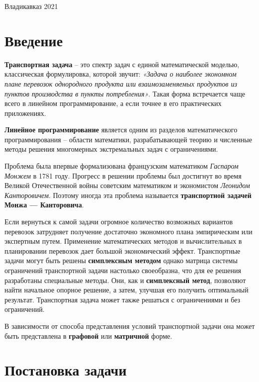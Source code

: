 \documentclass[a4paper,12pt]{article}
\begin{document}
\normalsize{ \hspace{28pt}} \hfill \break
\begin{center} Владикавказ 2021 \end{center}
\thispagestyle{empty}


\tableofcontents{}
\clearpage

\section{Введение}
	\textbf{Транспортная задача} – это спектр задач с единой математической моделью, классическая формулировка, которой звучит: \textit{«Задача о наиболее экономном плане перевозок однородного продукта или взаимозаменяемых продуктов из пунктов производства в пункты потребления»}. Такая форма встречается чаще всего в линейном программирование, а если точнее в его практических приложениях. 
	
	\textbf{Линейное программирование} является одним из разделов математического программирования – области математики, разрабатывающей теорию и численные методы решения многомерных экстремальных задач с ограничениями.
	
	Проблема была впервые формализована французским математиком \textit{Гаспаром Монжем} в 1781 году. Прогресс в решении проблемы был достигнут во время Великой Отечественной войны советским математиком и экономистом \textit{Леонидом Канторовичем}. Поэтому иногда эта проблема называется \textbf{транспортной задачей Монжа — Канторовича}.
	
	Если вернуться к самой задачи огромное количество возможных вариантов перевозок затрудняет получение достаточно экономного плана эмпирическим или экспертным путем. Применение математических методов и вычислительных в планировании перевозок дает большой экономический эффект. Транспортные задачи могут быть решены \textbf{симплексным методом} однако матрица системы ограничений транспортной задачи настолько своеобразна, что для ее решения разработаны специальные методы. Они, как и \textbf{симплексный метод}, позволяют найти начальное опорное решение, а затем, улучшая его получить оптимальный результат. Транспортная задача может
	также решаться с ограничениями и без ограничений.
	
	В зависимости от способа представления условий транспортной задачи она может быть представлена в \textbf{графовой} или \textbf{матричной} форме.
	
	\newpage
\section{Постановка задачи}
	
\end{document}
